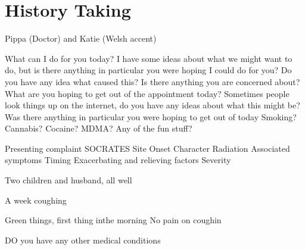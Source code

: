 \section{History Taking}

Pippa (Doctor) and Katie (Welsh accent)

What can I do for you today?
I have some ideas about what we might want to do, but is there anything in particular you were hoping I could do for you?
Do you have any idea what caused this?
Is there anything you are concerned about?
What are you hoping to get out of the appointment today?
Sometimes people look things up on the internet, do you have any ideas about what this might be?
Was there anything in particular you were hoping to get out of today
Smoking? Cannabis? Cocaine? MDMA? Any of the fun stuff?


Presenting complaint
SOCRATES
Site
Onset
Character
Radiation
Associated symptoms
Timing
Exacerbating and relieving factors
Severity


Two children and husband, all well

A week coughing

Green things, first thing inthe morning 
No pain on coughin

DO you have any other medical conditions

